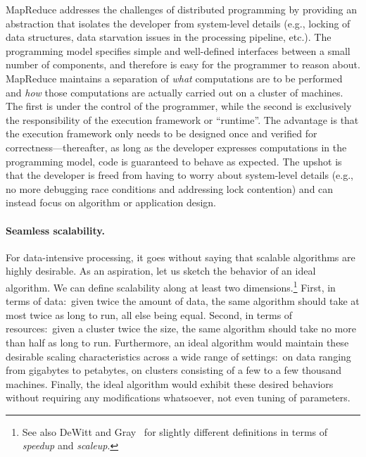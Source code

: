 MapReduce addresses the challenges of distributed programming by
providing an abstraction that isolates the developer from system-level
details (e.g., locking of data structures, data starvation issues in
the processing pipeline, etc.).  The programming model specifies
simple and well-defined interfaces between a small number of
components, and therefore is easy for the programmer to reason about.
MapReduce maintains a separation of {\it what} computations are to be
performed and {\it how} those computations are actually carried out on
a cluster of machines.  The first is under the control of the
programmer, while the second is exclusively the responsibility of the
execution framework or ``runtime''.  The advantage is that the
execution framework only needs to be designed once and verified for
correctness---thereafter, as long as the developer expresses
computations in the programming model, code is guaranteed to behave as
expected.  The upshot is that the developer is freed from having to
worry about system-level details (e.g., no more debugging race
conditions and addressing lock contention) and can instead focus on
algorithm or application design.

\paragraph{Seamless scalability.}
For data-intensive processing, it goes without saying that scalable
algorithms are highly desirable.  As an aspiration, let us sketch the
behavior of an ideal algorithm.  We can define scalability along at
least two dimensions.\footnote{See also DeWitt and
  Gray~\cite{DeWitt_Gray_CACM1992} for slightly different definitions
  in terms of {\it speedup} and {\it scaleup}.}  First, in terms of
data:\ given twice the amount of data, the same algorithm should take
at most twice as long to run, all else being equal.  Second, in terms
of resources:\ given a cluster twice the size, the same algorithm
should take no more than half as long to run.  Furthermore, an ideal
algorithm would maintain these desirable scaling characteristics
across a wide range of settings:\ on data ranging from gigabytes to
petabytes, on clusters consisting of a few to a few thousand machines.
Finally, the ideal algorithm would exhibit these desired behaviors
without requiring any modifications whatsoever, not even tuning of
parameters.

